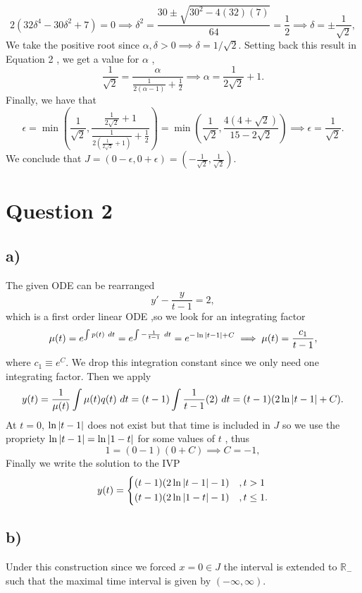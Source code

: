 \documentclass[
	12pt,
	]{article}
\theoremstyle{definition}
\theoremstyle{definition}
\theoremstyle{definition}
\theoremstyle{definition}
\theoremstyle{definition}
\theoremstyle{example}
\theoremstyle{note}
\theoremstyle{remark}
\theoremstyle{example}
\begin{document}
			 $$2(32\delta^{4}  -30\delta^{2} + 7) =0 \implies \delta^{2} = \frac{30 \pm \sqrt{30^{2} - 4(32)(7)}}{64}= \frac12 \implies \delta =\pm\frac{1}{\sqrt{2}}, $$
			 We take the positive root since $\alpha, \delta > 0 \implies \delta  = 1/\sqrt{2}$. Setting back this result in Equation 2 , we get a value for $\alpha$ ,
			 $$ \frac{1}{\sqrt{2}} = \frac{\alpha }{\frac{1}{2(\alpha-1)} + \frac12} \implies\alpha = \frac{1}{2\sqrt{2}}+1.$$
			 Finally, we have that 
			 $$ \epsilon = \min\left(\frac{1}{\sqrt{2}}, \frac{\frac{1}{2\sqrt{2}} + 1}{\frac{1}{2\left(\frac{1}{2\sqrt{2}} + 1\right)} + \frac12}\right) = \min\left(\frac{1}{\sqrt{2}} , \frac{4(4 + \sqrt{2})}{15-2\sqrt{2}}\right) \implies \epsilon = \frac{1}{\sqrt{2}}.$$
			 We conclude that $J = (0-\epsilon, 0+ \epsilon) =\left(-\frac{1}{\sqrt{2}} , \frac{1}{\sqrt{2}}\right)$.
		\section*{Question 2}
			\subsection*{a) }
			The given ODE can be rearranged 
			$$ y' - \frac{y}{t-1} =2,$$
			which is a first order linear ODE ,so we look for an integrating factor
			\begin{equation*}
				\mu(t) = e^{\int p(t) \ dt} = e^{\int -\frac{1}{t-1} \ dt} = e^{-\ln \abs{t-1} + C}\implies \mu(t) = \frac{c_{1}}{t-1},
			\end{equation*} 
			where $c_{1} \equiv e^{C}$. We drop this integration constant since we only need one integrating factor. Then we apply 
			\begin{gather*}
				y(t) = \frac{1}{\mu(t)} \int \mu(t) q(t) \ dt = (t-1)\int \frac{1}{t-1}(2) \ dt = (t-1) (2\ln\abs{t-1} + C).
			\end{gather*}
			\noindent At $t=0$, $\ln\abs{t-1}$ does not exist but that time is included in $J$ so we use the propriety $\ln\abs{t-1} = \ln\abs{1-t} $ for some values of $t$ , thus
			$$ 1= (0-1)(0 + C) \implies C = -1,$$
			Finally we write the solution to the IVP 
			\begin{equation*}
				y(t) = \begin{cases*}
					(t-1)(2\ln\abs{t-1} -1) \quad ,t>1 \\
					(t-1)(2\ln\abs{1-t} -1) \quad ,t\le 1.
 				\end{cases*}
			\end{equation*}
			\subsection*{b) }
				Under this construction since we forced $x=0 \in J $ the interval is extended to $\mathbb{R}_{-}$ such that the maximal time interval is given by $(-\infty,\infty)$.
\end{document}
